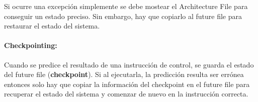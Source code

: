 Si ocurre una excepción simplemente se debe mostear el Architecture File para conseguir un estado preciso. Sin embargo, hay que copiarlo al future file para restaurar el estado del sistema.

\paragraph{Checkpointing:} Cuando se predice el resultado de una instrucción de control, se guarda el estado del future file (\textbf{checkpoint}). Si al ejecutarla, la predicción resulta ser errónea entonces solo hay que copiar la información del checkpoint en el future file para recuperar el estado del sistema y comenzar de nuevo en la instrucción correcta.  
